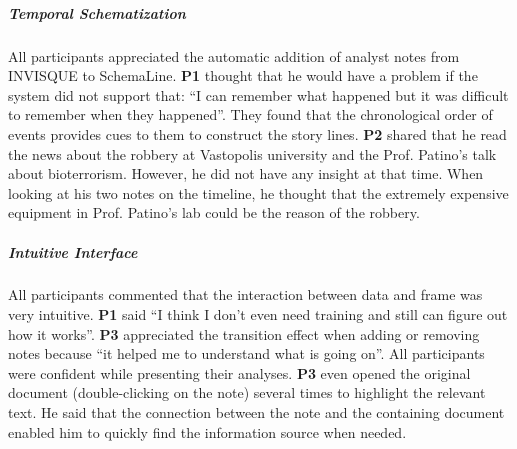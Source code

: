 \subparagraph{Temporal Schematization}
All participants appreciated the automatic addition of analyst notes from INVISQUE to SchemaLine. \textbf{P1} thought that he would have a problem if the system did not support that: ``I can remember what happened but it was difficult to remember when they happened''. They found that the chronological order of events provides cues to them to construct the story lines. \textbf{P2} shared that he read the news about the robbery at Vastopolis university and the Prof. Patino's talk about bioterrorism. However, he did not have any insight at that time. When looking at his two notes on the timeline, he thought that the extremely expensive equipment in Prof. Patino's lab could be the reason of the robbery. 

\subparagraph{Intuitive Interface}
All participants commented that the interaction between data and frame was very intuitive. \textbf{P1} said ``I think I don't even need training and still can figure out how it works''. \textbf{P3} appreciated the transition effect when adding or removing notes because ``it helped me to understand what is going on''. All participants were confident while presenting their analyses. \textbf{P3} even opened the original document (double-clicking on the note) several times to highlight the relevant text. He said that the connection between the note and the containing document enabled him to quickly find the information source when needed.